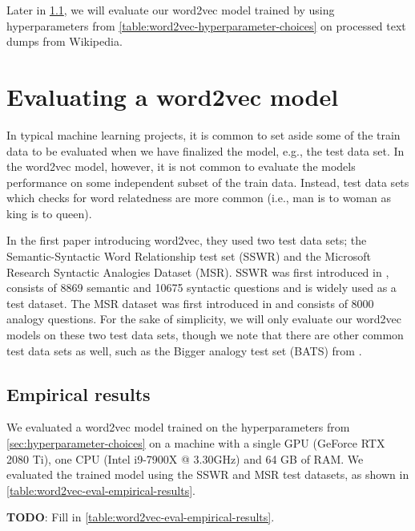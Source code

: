 Later in \cref{sec:word2vec-eval-empirical-results}, we will evaluate our word2vec model trained by using hyperparameters from \cref{table:word2vec-hyperparameter-choices} on processed text dumps from Wikipedia.

\section{Evaluating a word2vec model}
\label{sec:eval-word2vec-model}
In typical machine learning projects, it is common to set aside some of the train data to be evaluated when we have finalized the model, e.g., the test data set. In the word2vec model, however, it is not common to evaluate the models performance on some independent subset of the train data. Instead, test data sets which checks for word relatedness are more common (i.e., man is to woman as king is to queen).

In the first paper introducing word2vec, they used two test data sets; the Semantic-Syntactic Word Relationship test set (SSWR) and the Microsoft Research Syntactic Analogies Dataset (MSR). SSWR was first introduced in \cite{mikolov2013a}, consists of 8869 semantic and 10675 syntactic questions and is widely used as a test dataset. The MSR dataset was first introduced in \cite{mikolov-etal-2013-linguistic} and consists of 8000 analogy questions. For the sake of simplicity, we will only evaluate our word2vec models on these two test data sets, though we note that there are other common test data sets as well, such as the Bigger analogy test set (BATS) from \cite{gladkova-etal-2016-analogy}.

\subsection{Empirical results}
\label{sec:word2vec-eval-empirical-results}
We evaluated a word2vec model trained on the hyperparameters from \cref{sec:hyperparameter-choices} on a machine with a single GPU (GeForce RTX 2080 Ti), one CPU (Intel i9-7900X @ 3.30GHz) and 64 GB of RAM. We evaluated the trained model using the SSWR and MSR test datasets, as shown in \cref{table:word2vec-eval-empirical-results}.

\textbf{TODO}: Fill in \cref{table:word2vec-eval-empirical-results}.

